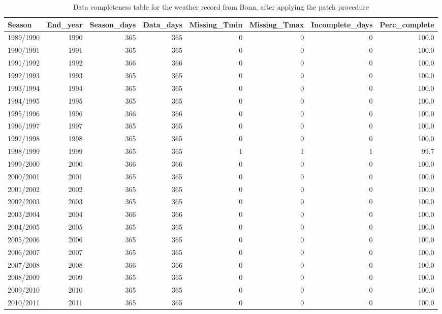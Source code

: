 \documentclass[
]{book}
\begin{document}
\begin{table}

\caption{\label{tab:unnamed-chunk-18}Data completeness table for the weather record from Bonn, after applying the patch procedure}
\fontsize{10}{12}\selectfont
\begin{tabular}[t]{l|r|r|r|r|r|r|r}
\hline
Season & End\_year & Season\_days & Data\_days & Missing\_Tmin & Missing\_Tmax & Incomplete\_days & Perc\_complete\\
\hline
1989/1990 & 1990 & 365 & 365 & 0 & 0 & 0 & 100.0\\
\hline
1990/1991 & 1991 & 365 & 365 & 0 & 0 & 0 & 100.0\\
\hline
1991/1992 & 1992 & 366 & 366 & 0 & 0 & 0 & 100.0\\
\hline
1992/1993 & 1993 & 365 & 365 & 0 & 0 & 0 & 100.0\\
\hline
1993/1994 & 1994 & 365 & 365 & 0 & 0 & 0 & 100.0\\
\hline
1994/1995 & 1995 & 365 & 365 & 0 & 0 & 0 & 100.0\\
\hline
1995/1996 & 1996 & 366 & 366 & 0 & 0 & 0 & 100.0\\
\hline
1996/1997 & 1997 & 365 & 365 & 0 & 0 & 0 & 100.0\\
\hline
1997/1998 & 1998 & 365 & 365 & 0 & 0 & 0 & 100.0\\
\hline
1998/1999 & 1999 & 365 & 365 & 1 & 1 & 1 & 99.7\\
\hline
1999/2000 & 2000 & 366 & 366 & 0 & 0 & 0 & 100.0\\
\hline
2000/2001 & 2001 & 365 & 365 & 0 & 0 & 0 & 100.0\\
\hline
2001/2002 & 2002 & 365 & 365 & 0 & 0 & 0 & 100.0\\
\hline
2002/2003 & 2003 & 365 & 365 & 0 & 0 & 0 & 100.0\\
\hline
2003/2004 & 2004 & 366 & 366 & 0 & 0 & 0 & 100.0\\
\hline
2004/2005 & 2005 & 365 & 365 & 0 & 0 & 0 & 100.0\\
\hline
2005/2006 & 2006 & 365 & 365 & 0 & 0 & 0 & 100.0\\
\hline
2006/2007 & 2007 & 365 & 365 & 0 & 0 & 0 & 100.0\\
\hline
2007/2008 & 2008 & 366 & 366 & 0 & 0 & 0 & 100.0\\
\hline
2008/2009 & 2009 & 365 & 365 & 0 & 0 & 0 & 100.0\\
\hline
2009/2010 & 2010 & 365 & 365 & 0 & 0 & 0 & 100.0\\
\hline
2010/2011 & 2011 & 365 & 365 & 0 & 0 & 0 & 100.0\\

\end{tabular}
\end{table}
\end{document}
